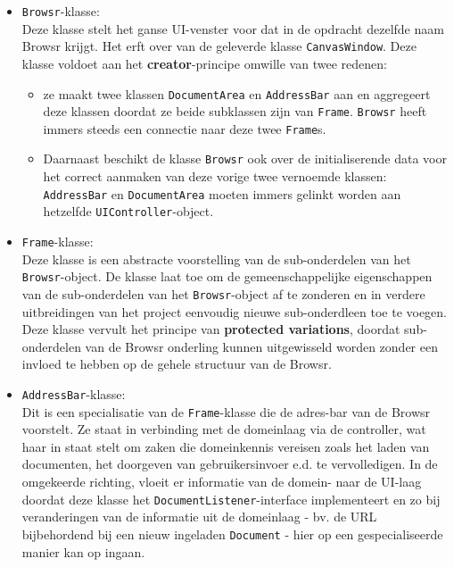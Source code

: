 \documentclass[12pt]{article}
\begin{document}
\begin{itemize}
	\item \texttt{Browsr}-klasse:\\
	Deze klasse stelt het ganse UI-venster voor dat in de opdracht dezelfde naam Browsr krijgt. Het erft over van de geleverde klasse \texttt{CanvasWindow}. Deze klasse voldoet aan het \textbf{creator}-principe omwille van twee redenen:
	\begin{itemize}
		\item ze maakt twee klassen \texttt{DocumentArea} en \texttt{AddressBar} aan en aggregeert deze klassen doordat ze beide subklassen zijn van \texttt{Frame}. \texttt{Browsr} heeft immers steeds een connectie naar deze twee \texttt{Frame}s.
		\item Daarnaast beschikt de klasse \texttt{Browsr} ook over de initialiserende data voor het correct aanmaken van deze vorige twee vernoemde klassen: \texttt{AddressBar} en \texttt{DocumentArea} moeten immers gelinkt worden aan hetzelfde \texttt{UIController}-object.
	\end{itemize}
	 
	 \item \texttt{Frame}-klasse:\\
	 Deze klasse is een abstracte voorstelling van de sub-onderdelen van het \texttt{Browsr}-object. De klasse laat toe om de gemeenschappelijke eigenschappen van de sub-onderdelen van het \texttt{Browsr}-object af te zonderen en in verdere uitbreidingen van het project eenvoudig nieuwe sub-onderdleen toe te voegen.
	 Deze klasse vervult het principe van \textbf{protected variations}, doordat sub-onderdelen van de Browsr onderling kunnen uitgewisseld worden zonder een invloed te hebben op de gehele structuur van de Browsr.
	 
	 \item \texttt{AddressBar}-klasse:\\
	 Dit is een specialisatie van de \texttt{Frame}-klasse die de adres-bar van de Browsr voorstelt. Ze staat in verbinding met de domeinlaag via de controller, wat haar in staat stelt om zaken die domeinkennis vereisen zoals het laden van documenten, het doorgeven van gebruikersinvoer e.d. te vervolledigen. In de omgekeerde richting, vloeit er informatie van de domein- naar de UI-laag doordat deze klasse het \texttt{DocumentListener}-interface implementeert en zo bij veranderingen van de informatie uit de domeinlaag - bv. de URL bijbehordend bij een nieuw ingeladen \texttt{Document} - hier op een gespecialiseerde manier kan op ingaan.
	 

\end{itemize}
\end{document}
